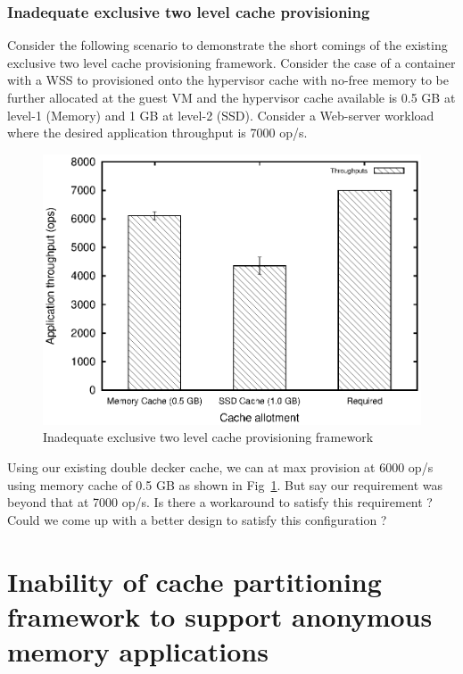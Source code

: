 	\subsubsection{Inadequate exclusive two level cache provisioning}
	  Consider the following scenario to demonstrate the short comings of the existing exclusive two level cache
	  provisioning framework. Consider the case of a container with a WSS to provisioned onto the hypervisor cache with 
	  no-free memory to be further allocated at the guest VM and the hypervisor cache available is 0.5 GB at 
	  level-1 (Memory) and 1 GB at level-2 (SSD). Consider a Web-server workload where the desired application
	  throughput is 7000 op/s.
	  
	  \begin{figure}
	    \centering
	    \includegraphics[scale=0.8]{images/dd_hybrid_motivation/throughput.eps}
	    \caption{Inadequate exclusive two level cache provisioning framework}
	    \label{plot:dd_hybrid_motivation}
	  \end{figure}
	  
	  Using our existing double decker cache, we can at max provision at 6000 op/s using memory cache of 0.5 GB as 
	  shown in Fig~\ref{plot:dd_hybrid_motivation}. But say our requirement was beyond that at 7000 op/s. Is there a 
	  workaround to satisfy this requirement ? Could we come up with a better design to satisfy this configuration ?
	  
    
    \section{Inability of cache partitioning framework to support anonymous memory applications} 
	
